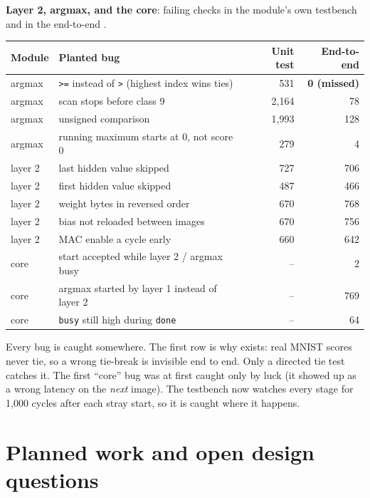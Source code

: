 \documentclass[11pt]{article}
\begin{document}
\textbf{Layer 2, argmax, and the core}: failing checks in the module's own
testbench and in the end-to-end .
\begin{center}
\begin{tabular}{@{}llrr@{}}
\toprule
Module & Planted bug & Unit test & End-to-end \\
\midrule
argmax   & \texttt{>=} instead of \texttt{>} (highest index wins ties) & 531  & \textbf{0 (missed)} \\
argmax   & scan stops before class 9                      & 2{,}164 & 78 \\
argmax   & unsigned comparison                            & 1{,}993 & 128 \\
argmax   & running maximum starts at 0, not score 0       & 279  & 4 \\
layer 2  & last hidden value skipped                      & 727  & 706 \\
layer 2  & first hidden value skipped                     & 487  & 466 \\
layer 2  & weight bytes in reversed order                 & 670  & 768 \\
layer 2  & bias not reloaded between images               & 670  & 756 \\
layer 2  & MAC enable a cycle early                       & 660  & 642 \\
core     & start accepted while layer 2 / argmax busy     & --   & 2 \\
core     & argmax started by layer 1 instead of layer 2   & --   & 769 \\
core     & \texttt{busy} still high during \texttt{done}  & --   & 64 \\
\bottomrule
\end{tabular}
\end{center}
Every bug is caught somewhere. The first row is why  exists:
real MNIST scores never tie, so a wrong tie-break is invisible end to end.
Only a directed tie test catches it. The first ``core'' bug was at first
caught only by luck (it showed up as a wrong latency on the \emph{next}
image). The testbench now watches every stage for 1{,}000 cycles after each
stray start, so it is caught where it happens.

\section{Planned work and open design questions}
\end{document}
